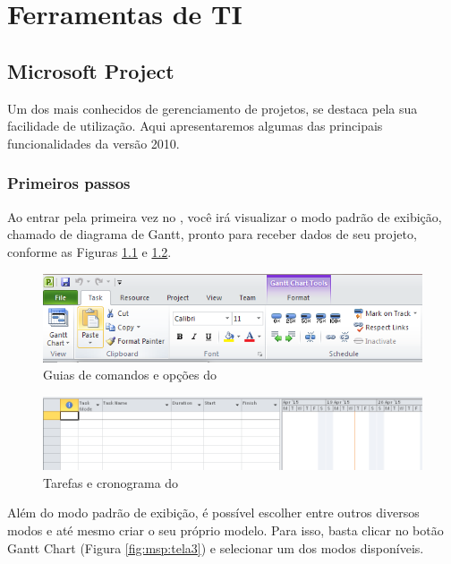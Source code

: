 
\chapter{Ferramentas de TI}

\section{Microsoft Project}

Um dos \sws mais conhecidos de gerenciamento de projetos, se destaca pela sua facilidade de utilização. Aqui apresentaremos algumas das principais funcionalidades da versão 2010.

\subsection{Primeiros passos}

Ao entrar pela primeira vez no \msp, você irá visualizar o modo padrão de exibição, chamado de diagrama de Gantt, pronto para receber dados de seu projeto, conforme as Figuras \ref{fig:msp:tela1} e \ref{fig:msp:tela2}.

\begin{figure}[!h]
\centering
\includegraphics[scale=0.45]{Figuras/project_inicio1.png}
\caption{Guias de comandos e opções do \msp}
\label{fig:msp:tela1}
\end{figure}

\begin{figure}[!h]
\centering
\includegraphics[scale=0.45]{Figuras/project_inicio2.png}
\caption{Tarefas e cronograma do \msp}
\label{fig:msp:tela2}
\end{figure}

Além do modo padrão de exibição, é possível escolher entre outros diversos modos e até mesmo criar o seu próprio modelo. Para isso, basta clicar no botão Gantt Chart (Figura \ref{fig:msp:tela3}) e selecionar um dos modos disponíveis.

